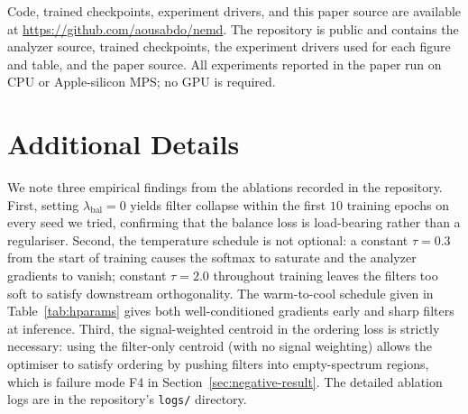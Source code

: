 \documentclass[journal]{IEEEtran}
\theoremstyle{remark}
\begin{document}
Code, trained checkpoints, experiment drivers, and this paper source
are available at \url{https://github.com/aousabdo/nemd}. The
repository is public and contains the analyzer source, trained
checkpoints, the experiment drivers used for each figure and table,
and the paper source. All experiments reported in the paper run on
CPU or Apple-silicon MPS; no GPU is required.

\section{Additional Details}
\label{app:ablation}

We note three empirical findings from the ablations recorded in the
repository. First, setting $\lambda_{\mathrm{bal}} = 0$ yields
filter collapse within the first $10$ training epochs on every seed
we tried, confirming that the balance loss is load-bearing rather
than a regulariser. Second, the temperature schedule is not optional:
a constant $\tau = 0.3$ from the start of training causes the softmax
to saturate and the analyzer gradients to vanish; constant $\tau =
2.0$ throughout training leaves the filters too soft to satisfy
downstream orthogonality. The warm-to-cool schedule given in
Table~\ref{tab:hparams} gives both well-conditioned gradients early
and sharp filters at inference. Third, the signal-weighted centroid
in the ordering loss is strictly necessary: using the filter-only
centroid (with no signal weighting) allows the optimiser to satisfy
ordering by pushing filters into empty-spectrum regions, which is
failure mode F4 in Section~\ref{sec:negative-result}. The detailed
ablation logs are in the repository's \texttt{logs/} directory.



\end{document}

